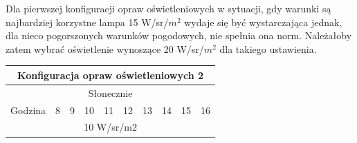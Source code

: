\documentclass[a4paper,12pt]{article}
\begin{document}
Dla pierwszej konfiguracji opraw oświetleniowych w sytuacji, gdy warunki są najbardziej korzystne lampa 15 W/sr/$m^{2}$ wydaje się być wystarczająca jednak, dla nieco pogorszonych  warunków pogodowych, nie spełnia ona norm. Należałoby zatem wybrać oświetlenie wynoszące 20 W/sr/$m^{2}$ dla takiego ustawienia.

\begin{table}[!ht]
\begin{tabular}{|c|c|c|c|c|c|c|c|c|c|}
\hline
\multicolumn{10}{|c|}{\cellcolor[HTML]{C8DFC8}Konfiguracja opraw oświetleniowych 2}                                                                                                                                                                                                                                                                                                                                                                                                                                                      \\ \hline
\multicolumn{10}{|c|}{\cellcolor[HTML]{EDD9A0}Słonecznie}                                                                                                                                                                                                                                                                                                                                                                                                                                                                                \\ \hline
Godzina                                     & \cellcolor[HTML]{FFFFFF}8                          & \cellcolor[HTML]{FFFFFF}9                          & \cellcolor[HTML]{FFFFFF}10                         & \cellcolor[HTML]{FFFFFF}11                         & \cellcolor[HTML]{FFFFFF}12                         & \cellcolor[HTML]{FFFFFF}13                         & \cellcolor[HTML]{FFFFFF}14                         & \cellcolor[HTML]{FFFFFF}15                         & \cellcolor[HTML]{FFFFFF}16                         \\ \hline
\multicolumn{10}{|c|}{10 W/sr/m2}                                                                                                                                                                                                                                                                                                                                                                                                                                                                                                        \\ \hline

\end{tabular}
\end{table}
\end{document}
